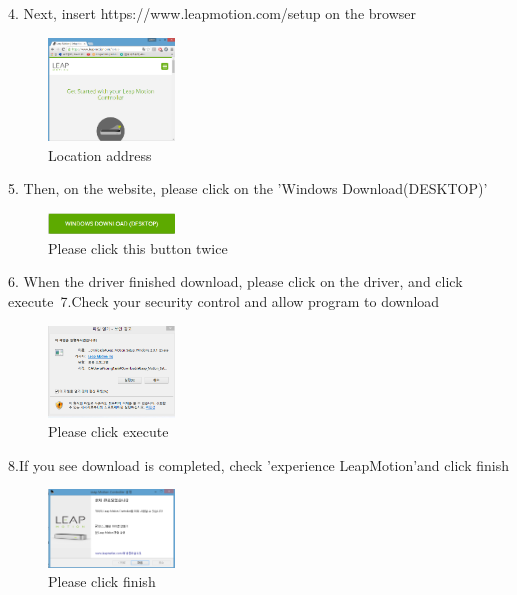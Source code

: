 \documentclass[10pt,journal,compsoc]{IEEEtran}
\begin{document}
4. Next, insert https://www.leapmotion.com/setup  on the browser\\
\begin{figure}[H]
\centering
\includegraphics[width=0.3\textwidth]{address.png}
{\caption*{Location address}}
\end{figure}

5. Then, on the website, please click on the 'Windows Download(DESKTOP)'\\
\begin{figure}[H]
\centering
\includegraphics[width=0.3\textwidth]{Download.png}
{\caption*{Please click  this button twice }}
\end{figure}

6. When the driver finished download, please click on the driver, and click execute\
7.Check your security control and allow program to download
\begin{figure}[H]
\centering
\includegraphics[width=0.3\textwidth]{Download1.png}
{\caption*{Please click execute}}
\end{figure}

8.If you see download is completed, check 'experience LeapMotion'and click finish \\
\begin{figure}[H]
\centering
\includegraphics[width=0.3\textwidth]{Download3.png}
{\caption*{Please click finish}}
\end{figure}
\end{document}
